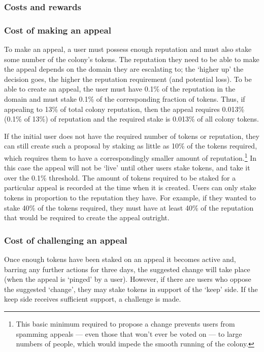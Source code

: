 \subsubsection{Costs and rewards}\label{sec:costs-of-appeals}

\subsubsection*{Cost of making an appeal}

To make an appeal, a user must possess enough reputation and must also stake some number of the colony's tokens. The reputation they need to be able to make the appeal depends on the domain they are escalating to; the `higher up' the decision goes, the higher the reputation requirement (and potential loss). To be able to create an appeal, the user must have 0.1\% of the reputation in the domain and must stake 0.1\% of the corresponding fraction of tokens. Thus, if appealing to 13\% of total colony reputation, then the appeal requires 0.013\% (0.1\% of 13\%) of reputation and the required stake is 0.013\% of all colony tokens.

If the initial user does not have the required number of tokens or reputation, they can still create such a proposal by staking as little as 10\% of the tokens required, which requires them to have a correspondingly smaller amount of reputation.\footnote{This basic minimum required to propose a change prevents users from spamming appeals --- even those that won’t ever be voted on --- to large numbers of people, which would impede the smooth running of the colony.} In this case the appeal will not be `live' until other users stake tokens, and take it over the 0.1\% threshold. The  amount of tokens required to be staked for a particular appeal is recorded at the time when it is created. Users can only stake tokens in proportion to the reputation they have. For example, if they wanted to stake 40\% of the tokens required, they must have at least 40\% of the reputation that would be required to create the appeal outright.

\subsubsection*{Cost of challenging an appeal}

Once enough tokens have been staked on an appeal it becomes active and, barring any further actions for three days, the suggested change will take place (when the appeal is `pinged' by a user). However, if there are users who oppose the suggested `change', they may stake tokens in support of the `keep' side. If the keep side receives sufficient support, a challenge is made.

